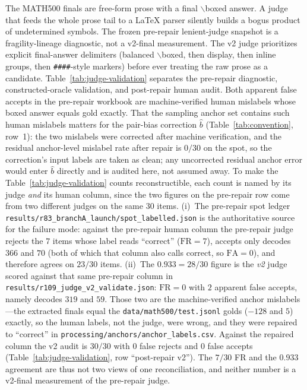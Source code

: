 \documentclass{article}
\begin{document}
The MATH500 finals are free-form prose with a final $\backslash$boxed answer.  A judge
that feeds the whole prose tail to a LaTeX parser silently builds a bogus product of
undetermined symbols.  The frozen pre-repair lenient-judge snapshot is a
fragility-lineage diagnostic, not a v2-final measurement.  The v2 judge prioritizes
explicit final-answer delimiters (balanced
$\backslash$boxed, then display, then inline groups, then \texttt{\#\#\#\#}-style \mbox{markers})
before ever treating the raw prose as a candidate.  Table~\ref{tab:judge-validation}
separates the pre-repair diagnostic, constructed-oracle validation, and post-repair
human audit.  Both apparent false accepts in the pre-repair workbook are
machine-verified human mislabels whose boxed answer equals gold exactly.  That the
sampling anchor set contains such human mislabels matters for the pair-bias
correction $\hat b$ (Table~\ref{tab:convention}, row~1): the two mislabels were
corrected after machine verification, and the residual anchor-level mislabel rate
after repair is $0/30$ on the spot, so the correction's input labels are taken as
clean; any uncorrected residual anchor error would enter $\hat b$ directly and is
audited here, not assumed away.  To make the Table~\ref{tab:judge-validation} counts
reconstructible, each count is named by its judge \emph{and} its human column, since
the two figures on the pre-repair row come from two different judges on the same
$30$ items.  (i)~The pre-repair spot ledger
\nolinkurl{results/r83_branchA_launch/spot_labelled.json} is the authoritative source
for the failure mode: against the pre-repair human column the pre-repair judge
rejects the $7$ items whose label reads ``correct'' ($\mathrm{FR}{=}7$), accepts only
decodes $366$ and $70$ (both of which that column also calls correct, so
$\mathrm{FA}{=}0$), and therefore agrees on $23/30$ items.  (ii)~The
$0.933=28/30$ figure is the \emph{v2} judge scored against that same pre-repair
column in \nolinkurl{results/r109_judge_v2_validate.json}: $\mathrm{FR}{=}0$ with $2$
apparent false accepts, namely decodes $319$ and $59$.  Those two are the
machine-verified anchor mislabels---the extracted finals equal the
\nolinkurl{data/math500/test.jsonl} golds ($-128$ and $5$) exactly, so the human
labels, not the judge, were wrong, and they were repaired to ``correct'' in
\nolinkurl{processing/anchors/anchor_labels.csv}.  Against the repaired column the v2
audit is $30/30$ with $0$ false rejects and $0$ false accepts
(Table~\ref{tab:judge-validation}, row ``post-repair v2'').  The $7/30$ FR and the
$0.933$ agreement are thus not two views of one reconciliation, and neither number
is a v2-final measurement of the pre-repair judge.
\end{document}
